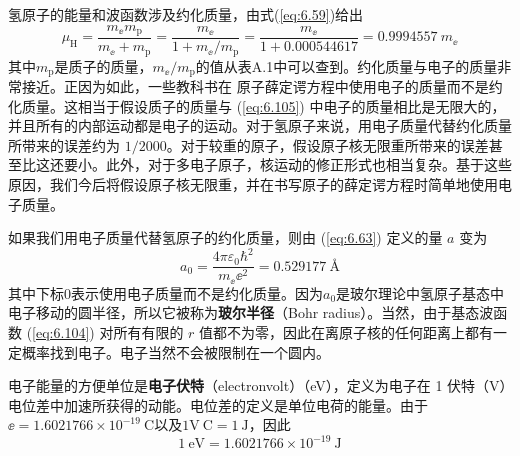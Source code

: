     氢原子的能量和波函数涉及约化质量，由式(\ref{eq:6.59})给出
    \begin{equation}
        \mu_{\mathrm{H}} = \frac{m_{\ee }m_{\mathrm{p}}}{m_{\ee } + m_{\mathrm{p}}} = \frac{m_{\ee }}{1+m_{\ee }/m_{\mathrm{p}}} = \frac{m_{\ee }}{1+0.000544617} = 0.9994557 \: m_{\ee }
        \label{eq:6.105}
    \end{equation}
    其中$m_{\mathrm{p}}$是质子的质量，$m_{\ee }/m_{\mathrm{p}}$的值从表A.1中可以查到。约化质量与电子的质量非常接近。正因为如此，一些教科书在  原子薛定谔方程中使用电子的质量而不是约化质量。这相当于假设质子的质量与 (\ref{eq:6.105}) 中电子的质量相比是无限大的，并且所有的内部运动都是电子的运动。对于氢原子来说，用电子质量代替约化质量所带来的误差约为 $1/2000$。对于较重的原子，假设原子核无限重所带来的误差甚至比这还要小。此外，对于多电子原子，核运动的修正形式也相当复杂。基于这些原因，我们今后将假设原子核无限重，并在书写原子的薛定谔方程时简单地使用电子质量。

    如果我们用电子质量代替氢原子的约化质量，则由 (\ref{eq:6.63}) 定义的量 $a$ 变为
    \begin{equation}
        a_0 = \frac{4\pi\varepsilon_0\hbar^2}{m_{\ee }\ee ^2} = 0.529177 \: \mathrm{Å}
        \label{eq:6.106}
    \end{equation}
    其中下标$0$表示使用电子质量而不是约化质量。因为$a_0$是玻尔理论中氢原子基态中电子移动的圆半径，所以它被称为\textbf{玻尔半径}（Bohr radius）。当然，由于基态波函数 (\ref{eq:6.104}) 对所有有限的 $r$ 值都不为零，因此在离原子核的任何距离上都有一定概率找到电子。电子当然不会被限制在一个圆内。

    电子能量的方便单位是\textbf{电子伏特}（electronvolt）（eV），定义为电子在 1 伏特（V）电位差中加速所获得的动能。电位差的定义是单位电荷的能量。由于$\ee = 1.6021766 \times 10^{-19} \: \mathrm{C}$以及$1 \mathrm{V} \: \mathrm{C} = 1 \: \mathrm{J}$，因此
    \begin{equation}
        1 \: \mathrm{eV} = 1.6021766 \times 10^{-19} \: \mathrm{J}
        \label{eq:6.107}
    \end{equation}

